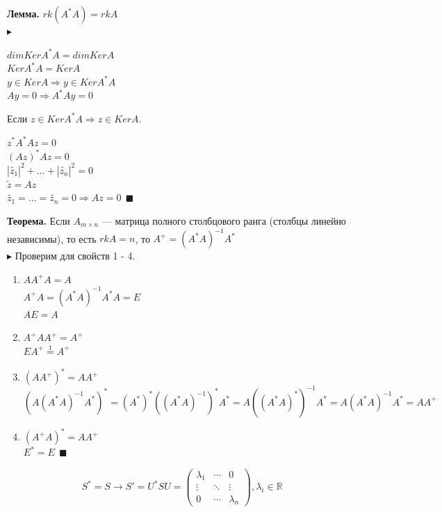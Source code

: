 \documentclass[12pt]{article}
\theoremstyle{definition}
\numberwithin{equation}{section}
\begin{document}
\textbf{Лемма.}
$rk(A^*A)=rkA$\\
$\blacktriangleright ~$ 
\begin{center}
$dim KerA^*A=dim KerA$\\
$Ker A^*A=Ker A$\\
$y \in KerA \Rightarrow y \in KerA^*A$\\
$Ay=0 \Rightarrow A^*Ay=0$\\
\end{center}
Если $z \in KerA^*A \Rightarrow z \in KerA$.\\
\begin{center}
$z^*A^*Az=0$\\
$(Az)^*Az=0$\\
$|\tilde{z_1}|^2+...+|\tilde{z_n}|^2=0$\\
$\tilde{z}=Az$\\
$\tilde{z_1}=...=\tilde{z_n}=0 \Rightarrow Az=0 ~~ \blacksquare$\\
\end{center}
\textbf{Теорема.}
Если $A_{m \times n}$ --- матрица полного столбцового ранга (столбцы линейно независимы), то есть $rkA=n$, то $A^+=(A^*A)^{-1}A^*$\\
$\blacktriangleright$ Проверим для свойств 1 - 4.
\begin{enumerate}
\item $AA^+A=A$\\
$A^+A=(A^*A)^{-1}A^*A=E$\\
$AE=A$
\item $A^+AA^+=A^+$\\
$EA^+\overset{1}{=}A^+$
\item $(AA^+)^*=AA^+$\\
$(A(A^*A)^{-1}A^*)^*=(A^*)^*((A^*A)^{-1})^*A^*=A((A^*A)^*)^{-1}A^*=A(A^*A)^{-1}A^*=AA^+$
\item $(A^+A)^*=AA^+$\\
$E^*=E ~~
\blacksquare$
\end{enumerate}
\[S^*=S \to S'=U^*SU = \begin{pmatrix}
\lambda_1 & \cdots & 0 \\         
\vdots & \ddots & \vdots \\
0 & \cdots & \lambda_n
\end{pmatrix}, \lambda_i \in \mathbb{R}\]
\end{document}

